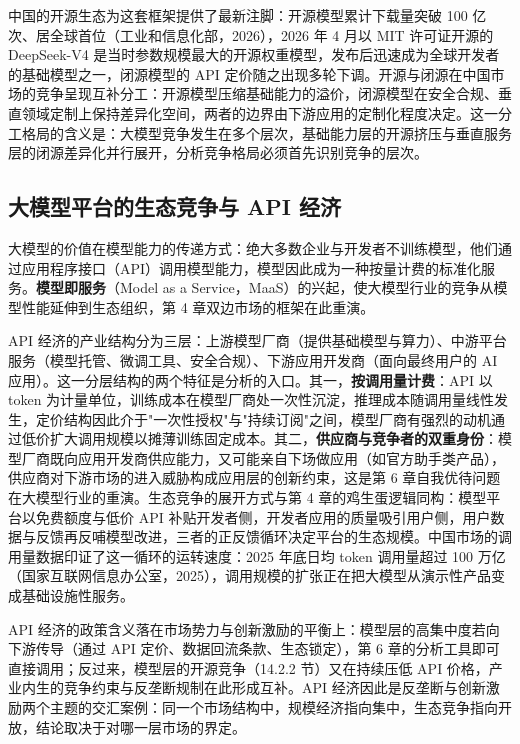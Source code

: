 中国的开源生态为这套框架提供了最新注脚：开源模型累计下载量突破 100 亿次、居全球首位（工业和信息化部，2026），2026 年 4 月以 MIT 许可证开源的 DeepSeek-V4 是当时参数规模最大的开源权重模型，发布后迅速成为全球开发者的基础模型之一，闭源模型的 API 定价随之出现多轮下调。开源与闭源在中国市场的竞争呈现互补分工：开源模型压缩基础能力的溢价，闭源模型在安全合规、垂直领域定制上保持差异化空间，两者的边界由下游应用的定制化程度决定。这一分工格局的含义是：大模型竞争发生在多个层次，基础能力层的开源挤压与垂直服务层的闭源差异化并行展开，分析竞争格局必须首先识别竞争的层次。

\subsection{大模型平台的生态竞争与 API 经济}

大模型的价值在模型能力的传递方式：绝大多数企业与开发者不训练模型，他们通过应用程序接口（API）调用模型能力，模型因此成为一种按量计费的标准化服务。\textbf{模型即服务}（Model as a Service，MaaS）的兴起，使大模型行业的竞争从模型性能延伸到生态组织，第 4 章双边市场的框架在此重演。

API 经济的产业结构分为三层：上游模型厂商（提供基础模型与算力）、中游平台服务（模型托管、微调工具、安全合规）、下游应用开发商（面向最终用户的 AI 应用）。这一分层结构的两个特征是分析的入口。其一，\textbf{按调用量计费}：API 以 token 为计量单位，训练成本在模型厂商处一次性沉淀，推理成本随调用量线性发生，定价结构因此介于"一次性授权"与"持续订阅"之间，模型厂商有强烈的动机通过低价扩大调用规模以摊薄训练固定成本。其二，\textbf{供应商与竞争者的双重身份}：模型厂商既向应用开发商供应能力，又可能亲自下场做应用（如官方助手类产品），供应商对下游市场的进入威胁构成应用层的创新约束，这是第 6 章自我优待问题在大模型行业的重演。生态竞争的展开方式与第 4 章的鸡生蛋逻辑同构：模型平台以免费额度与低价 API 补贴开发者侧，开发者应用的质量吸引用户侧，用户数据与反馈再反哺模型改进，三者的正反馈循环决定平台的生态规模。中国市场的调用量数据印证了这一循环的运转速度：2025 年底日均 token 调用量超过 100 万亿（国家互联网信息办公室，2025），调用规模的扩张正在把大模型从演示性产品变成基础设施性服务。

API 经济的政策含义落在市场势力与创新激励的平衡上：模型层的高集中度若向下游传导（通过 API 定价、数据回流条款、生态锁定），第 6 章的分析工具即可直接调用；反过来，模型层的开源竞争（14.2.2 节）又在持续压低 API 价格，产业内生的竞争约束与反垄断规制在此形成互补。API 经济因此是反垄断与创新激励两个主题的交汇案例：同一个市场结构中，规模经济指向集中，生态竞争指向开放，结论取决于对哪一层市场的界定。

